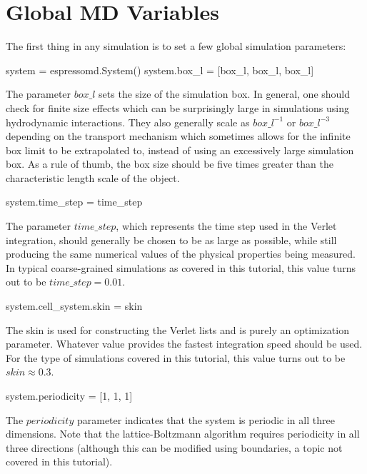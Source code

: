 \documentclass[
paper=a4,                       %
fontsize=11pt,                  %
twoside,                        %
footsepline,                    %
headsepline,                    %
headinclude=false,              %
footinclude=false,              %
pagesize,                       %
]{scrartcl}
\begin{document}
\section{Global MD Variables}\label{sec:espresso}

  The first thing in any \es{} simulation is to set a few global simulation parameters:

{\small\vspace{0,2cm}
\begin{pypresso}
system = espressomd.System()
system.box_l = [box_l, box_l, box_l]
\end{pypresso}\vspace{0,2cm}
}

The parameter $box\_l$ sets the size of the simulation box. In general, one should check for finite
size effects which can be surprisingly large in simulations using hydrodynamic interactions. They
also generally scale as $box\_l^{-1}$ or $box\_l^{-3}$ depending on the transport mechanism
which sometimes allows for the infinite box limit to be extrapolated to, instead of using an
excessively large simulation box. As a rule of thumb, the box size should be five times greater than the characteristic
length scale of the object. 
{\small\vspace{0,2cm}
\begin{pypresso}[numbers=none]
system.time_step = time_step
\end{pypresso}\vspace{0,2cm}
}
The parameter $time\_step$, which represents the time step used in the Verlet
integration, should generally be chosen to be as large as possible, while still producing the same numerical
values of the physical properties being measured. In typical coarse-grained simulations as
covered in this tutorial, this value turns out to be $time\_step=0.01$.
{\small\vspace{0,2cm}
\begin{pypresso}[numbers=none]
system.cell_system.skin = skin
\end{pypresso}\vspace{0,2cm}
}
 The skin is used for constructing
the Verlet lists and is purely an optimization parameter. Whatever value provides the fastest
integration speed should be used. For the type of simulations covered in this tutorial, this value turns out
to be $skin \approx 0.3$.
{\small\vspace{0,2cm}
\begin{pypresso}[numbers=none]
system.periodicity = [1, 1, 1]
\end{pypresso}\vspace{0,2cm}
}
The $periodicity$ parameter indicates that the system is periodic in all three
dimensions. Note that the lattice-Boltzmann algorithm requires periodicity in all three directions (although
this can be modified using boundaries, a topic not covered in this tutorial). 
\end{document}
